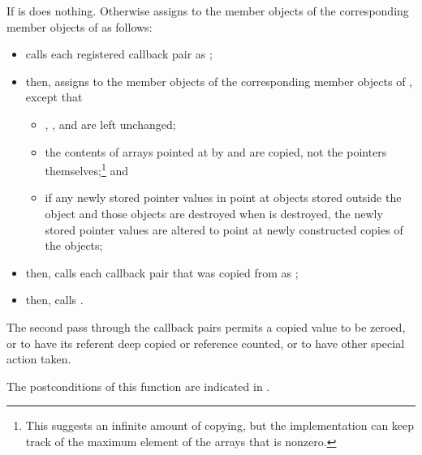 \begin{itemdescr}
\pnum
\effects
If
 is 
does nothing.
Otherwise assigns to the member objects of
the corresponding member objects of  as follows:

\begin{itemize}
\item calls each registered callback pair  as
;

\item then, assigns to the member objects of  the corresponding member objects of
, except that

\begin{itemize}
\item {}, , and  are left unchanged;

\item the contents of arrays pointed at by  and  are copied,
not the pointers themselves;\footnote{ This suggests an infinite amount of copying, but the implementation can keep
track of the maximum element of the arrays that is nonzero.}
and

\item if any newly stored pointer values in  point at objects stored outside
the object  and those objects are destroyed when  is destroyed, the
newly stored pointer values are altered to point at newly constructed copies of the
objects;
\end{itemize}

\item then, calls each callback pair that was copied from  as
;

\item then, calls .
\end{itemize}

\pnum
\begin{note}
The second pass through the callback pairs permits a copied 
value to be zeroed, or to have its referent deep copied or reference counted, or to have
other special action taken.
\end{note}

\pnum
\ensures
The postconditions of this function are indicated in .


\end{itemdescr}
